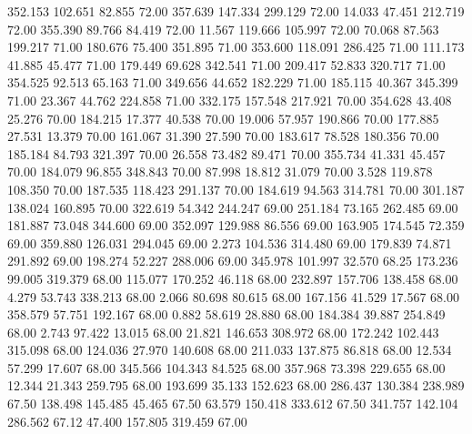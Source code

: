  352.153  102.651   82.855        72.00
 357.639  147.334  299.129        72.00
  14.033   47.451  212.719        72.00
 355.390   89.766   84.419        72.00
  11.567  119.666  105.997        72.00
  70.068   87.563  199.217        71.00
 180.676   75.400  351.895        71.00
 353.600  118.091  286.425        71.00
 111.173   41.885   45.477        71.00
 179.449   69.628  342.541        71.00
 209.417   52.833  320.717        71.00
 354.525   92.513   65.163        71.00
 349.656   44.652  182.229        71.00
 185.115   40.367  345.399        71.00
  23.367   44.762  224.858        71.00
 332.175  157.548  217.921        70.00
 354.628   43.408   25.276        70.00
 184.215   17.377   40.538        70.00
  19.006   57.957  190.866        70.00
 177.885   27.531   13.379        70.00
 161.067   31.390   27.590        70.00
 183.617   78.528  180.356        70.00
 185.184   84.793  321.397        70.00
  26.558   73.482   89.471        70.00
 355.734   41.331   45.457        70.00
 184.079   96.855  348.843        70.00
  87.998   18.812   31.079        70.00
   3.528  119.878  108.350        70.00
 187.535  118.423  291.137        70.00
 184.619   94.563  314.781        70.00
 301.187  138.024  160.895        70.00
 322.619   54.342  244.247        69.00
 251.184   73.165  262.485        69.00
 181.887   73.048  344.600        69.00
 352.097  129.988   86.556        69.00
 163.905  174.545   72.359        69.00
 359.880  126.031  294.045        69.00
   2.273  104.536  314.480        69.00
 179.839   74.871  291.892        69.00
 198.274   52.227  288.006        69.00
 345.978  101.997   32.570        68.25
 173.236   99.005  319.379        68.00
 115.077  170.252   46.118        68.00
 232.897  157.706  138.458        68.00
   4.279   53.743  338.213        68.00
   2.066   80.698   80.615        68.00
 167.156   41.529   17.567        68.00
 358.579   57.751  192.167        68.00
   0.882   58.619   28.880        68.00
 184.384   39.887  254.849        68.00
   2.743   97.422   13.015        68.00
  21.821  146.653  308.972        68.00
 172.242  102.443  315.098        68.00
 124.036   27.970  140.608        68.00
 211.033  137.875   86.818        68.00
  12.534   57.299   17.607        68.00
 345.566  104.343   84.525        68.00
 357.968   73.398  229.655        68.00
  12.344   21.343  259.795        68.00
 193.699   35.133  152.623        68.00
 286.437  130.384  238.989        67.50
 138.498  145.485   45.465        67.50
  63.579  150.418  333.612        67.50
 341.757  142.104  286.562        67.12
  47.400  157.805  319.459        67.00
